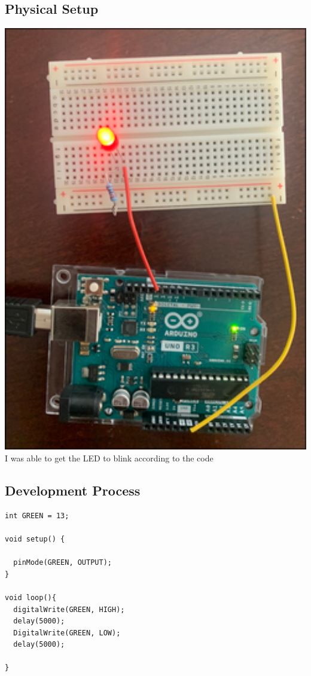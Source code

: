 \documentclass[12pt]{article}
\begin{document}
\subsection{Physical Setup}
\includegraphics[width=1.0\textwidth]{PhysicalSingleLED.png}
I was able to get the LED to blink according to the code


\subsection{Development Process}
\begin{tcolorbox}[
    enhanced,
    attach boxed title to top left={xshift=6mm,yshift=-3mm},
    colback=lightgreen!20,
    colframe=lightgreen,
    colbacktitle=lightgreen,
    title=Code for Single LED,
    fonttitle=\bfseries\color{black},
    boxed title style={size=small,colframe=lightgreen,sharp corners},
    sharp corners,
]
\begin{verbatim}
int GREEN = 13;

void setup() {
 
  pinMode(GREEN, OUTPUT);
}

void loop(){
  digitalWrite(GREEN, HIGH);
  delay(5000);
  DigitalWrite(GREEN, LOW);
  delay(5000);

}

\end{verbatim}
\end{tcolorbox}
\end{document}

